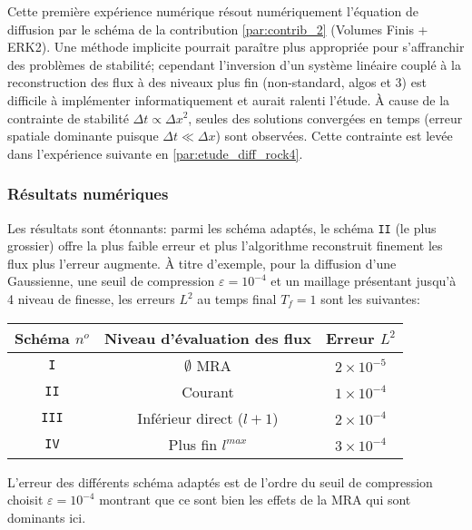 Cette première expérience numérique résout numériquement l'équation de diffusion par le schéma de la contribution \ref{par:contrib_2} (Volumes Finis + ERK2).
Une méthode implicite pourrait paraître plus appropriée pour s'affranchir des problèmes de stabilité; cependant l'inversion d'un système linéaire couplé à 
la reconstruction des flux à des niveaux plus fin (non-standard, algos \texttt{} et 3) est difficile à implémenter informatiquement et aurait ralenti l'étude.
À cause de la contrainte de stabilité $\Delta t \propto \Delta x^2$,
seules des solutions convergées en temps (erreur spatiale dominante puisque $\Delta t \ll \Delta x$) sont observées. Cette contrainte est levée dans l'expérience suivante en \ref{par:etude_diff_rock4}.\par 
\subsubsection{Résultats numériques}
Les résultats sont étonnants: parmi les schéma adaptés, le schéma \texttt{II} (le plus grossier) offre la plus faible erreur et plus l'algorithme reconstruit finement les flux plus l'erreur augmente. 
À titre d'exemple, pour la diffusion d'une Gaussienne, une seuil de compression $\varepsilon = 10^{-4}$ et un maillage présentant jusqu'à 4 niveau de finesse, les erreurs $L^2$ au temps final $T_f=1$ sont les suivantes:\par
\begin{center}\begin{tabular}{|c|c|c|}
\hline
Schéma $n^o$ & Niveau d'évaluation des flux & Erreur $L^2$ \\
\hline
\texttt{I} & $\emptyset$ MRA & $2 \times 10^{-5}$ \\
\texttt{II} & Courant & $1 \times 10^{-4}$ \\
\texttt{III} & Inférieur direct ($l+1$) & $2 \times 10^{-4}$ \\
\texttt{IV} & Plus fin $l^{max}$& $3 \times 10^{-4}$ \\

\hline
\end{tabular}\end{center}
L'erreur des différents schéma adaptés est de l'ordre du seuil de compression choisit $\varepsilon = 10^{-4}$ montrant que ce sont bien
les effets de la MRA qui sont dominants ici.
